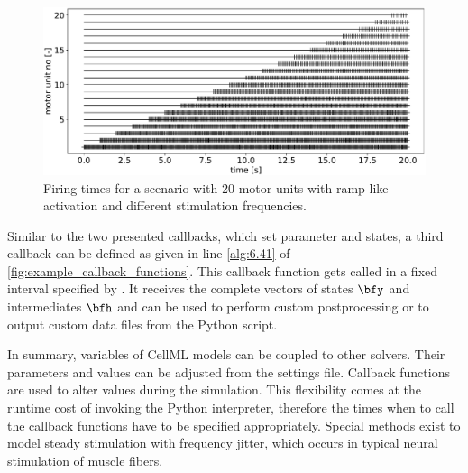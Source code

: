 \begin{figure}%
  \centering%
  \includegraphics[width=\textwidth]{images/implementation/firing_times_ramp1.pdf}%
  \caption{Firing times for a scenario with 20 motor units with ramp-like activation and different stimulation frequencies.}%
  \label{fig:firing_times_ramp}%
\end{figure}%

Similar to the two presented callbacks, which set parameter and states, a third callback  can be defined as given in line \ref{alg:6.41} of \cref{fig:example_callback_functions}. This callback function gets called in a fixed interval specified by . It receives the complete vectors of states $\bfy$ and intermediates $\bfh$ and can be used to perform custom postprocessing or to output custom data files from the Python script.

In summary, variables of CellML models can be coupled to other solvers. Their parameters and values can be adjusted from the settings file. Callback functions are used to alter values during the simulation. This flexibility comes at the runtime cost of invoking the Python interpreter, therefore the times when to call the callback functions have to be specified appropriately. Special methods exist to model steady stimulation with frequency jitter, which occurs in typical neural stimulation of muscle fibers.

